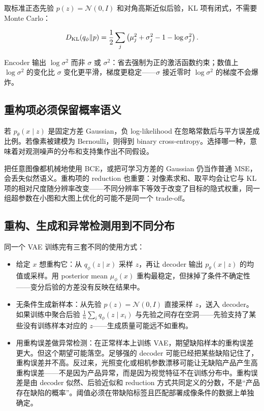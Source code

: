 取标准正态先验 \(p(z)=\mathcal N(0,I)\) 和对角高斯近似后验，KL 项有闭式，不需要 Monte Carlo：

\[
D_{\mathrm{KL}}(q_\phi\Vert p) = \frac12\sum_j\left(\mu_j^2 + \sigma_j^2 - 1 - \log\sigma_j^2\right).
\]

Encoder 输出 \(\log\sigma^2\) 而非 \(\sigma\) 或 \(\sigma^2\)：省去强制为正的激活函数约束；数值上 \(\log\sigma^2\) 的变化比 \(\sigma\) 变化更平滑，梯度更稳定——\(\sigma\) 接近零时 \(\log\sigma^2\) 的梯度不会爆炸。

\subsection{重构项必须保留概率语义}

若 \(p_\theta(x\mid z)\) 是固定方差 Gaussian，负 log-likelihood 在忽略常数后与平方误差成比例。若像素被建模为 Bernoulli，则得到 binary cross-entropy。选择哪一种，意味着对观测噪声的分布和支持集作出不同假设。

把任意图像都机械地使用 BCE，或把可学习方差的 Gaussian 仍当作普通 MSE，会丢失似然语义。重构项的 reduction 也重要：对像素求和、取平均会让它与 KL 项的相对尺度随分辨率改变——不同分辨率下等效于改变了目标的隐式权重，同一组超参数在小图和大图上优化的可能不是同一个 trade-off。

\subsection{重构、生成和异常检测用到不同分布}

同一个 VAE 训练完有三套不同的使用方式：

\begin{itemize}
\tightlist
\item
  给定 \(x\) 想重构它：从 \(q_\phi(z\mid x)\) 采样 \(z\)，再让 decoder 输出 \(p_\theta(x\mid z)\) 的均值或采样。用 posterior mean \(\mu_\phi(x)\) 重构最稳定，但抹掉了条件不确定性——变分后验的方差没有反映在结果中。
\item
  无条件生成新样本：从先验 \(p(z)=\mathcal N(0,I)\) 直接采样 \(z\)，送入 decoder。如果训练中聚合后验 \(\frac1n\sum_i q_\phi(z\mid x_i)\) 与先验之间存在空洞——先验支持了某些没有训练样本对应的 \(z\)——生成质量可能远不如重构。
\item
  用重构误差做异常检测：在正常样本上训练 VAE，期望缺陷样本的重构误差更大。但这个期望可能落空。足够强的 decoder 可能已经把某些缺陷记住了，重构误差并不高。反过来，光照变化或相机参数漂移可能让无缺陷产品产生高重构误差——不是因为产品异常，而是因为视觉特征不在训练分布中。重构误差是由 decoder 似然、后验近似和 reduction 方式共同定义的分数，不是``产品存在缺陷的概率''。阈值必须在带缺陷标签且匹配部署成像条件的数据上单独确定。
\end{itemize}


